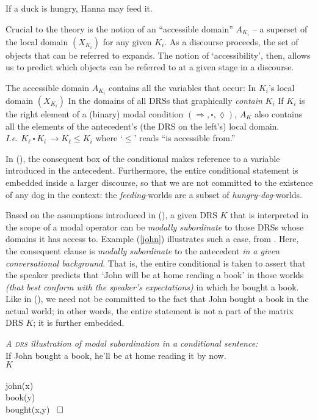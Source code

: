\ex \label{donkey} \label{drs-if} If a duck is hungry, Hanna may feed it. \\
\xe

Crucial to the theory is the notion of an ``accessible domain'' $ A_{K_i} $ -- a superset of the local domain $ (X_{K_i}) $ for any given $ K_i $. As a discourse proceeds, the set of objects that can be referred to expands. The notion of `accessibility', then, allows us to predict which objects can be referred to at a given stage in a discourse. 

\pex The accessible domain $ A_{K_i} $ contains all the variables that occur: 
\a In $ K_i $'s local domain $ (X_{K_i}) $
\a In the domains of all DRSs that graphically \textit{contain} $ K_i $
\a If $ K_i $ is the right element of a (binary) modal condition $(\Rightarrow,\square,\lozenge)$, $ A_K $ also contains all the elements of the antecedent's (the DRS on the left's) local domain.\\\textit{I.e.} $ K_\ell\,\square\,K_i\, \longrightarrow K_\ell\leqslant K_i$ where `$ \leqslant $' reads ``is accessible from.''\xe

In (\blastx), the consequent box of the conditional makes reference to a variable introduced in the antecedent. Furthermore, the entire conditional statement is embedded inside a larger discourse, so that we are not committed to the existence of any dog in the context: the \textit{feeding}-worlds are a subset of \textit{hungry-dog}-worlds.

Based on the assumptions introduced in (\lastx), a given DRS $ K $ that is interpreted in the scope of a modal operator can be \textit{modally subordinate} to those DRSs whose domains it has access to. Example (\ref{john}) illustrates such a case, from \citet[701]{Roberts1989}. Here, the consequent clause is \textit{modally subordinate} to the antecedent \textit{in a given conversational background}. That is, the entire conditional is taken to assert that the speaker predicts that `John will be at home reading a book' in those worlds \textit{(that best conform with the speaker's expectations)} in which he bought a book. Like in (\lastx), we need not be committed to the fact that John bought a book in the actual world; in other words, the entire statement is not a part of the matrix DRS $ K $; it is further embedded.


\ex \textit{A \textsc{drs} illustration of modal subordination in a conditional sentence:} \label{john}\\
If John bought a book, he'll be at home reading it by now.\\
\hspace*{.25\textwidth}$\scriptstyle K $\\
\drs{}
{\\		
	{
		john(x)\\
		book(y)\\
		bought(x,y)
	}
	~$ \boldsymbol{\LARGE\square} $		 
}\xe

